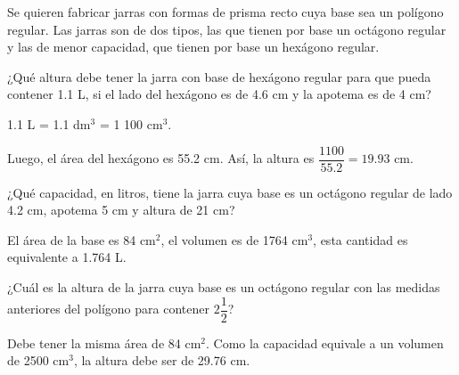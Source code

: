 Se quieren fabricar jarras con formas de prisma recto cuya base sea un
polígono regular. Las jarras son de dos tipos, las que tienen por base un
octágono regular y las de menor capacidad, que tienen por base un
hexágono regular.

\begin{parts}
    ¿Qué altura debe tener la jarra con base de hexágono regular para que pueda
    contener 1.1 L, si el lado del hexágono es de 4.6 cm y la apotema es de 4 cm?

    \begin{solutionbox}{2.2cm}
        1.1 L = 1.1 dm$^3$ = 1 100 cm$^3$.

        Luego, el área del hexágono es 55.2 cm.
        Así, la altura es $\dfrac{1100}{55.2} = 19.93$ cm.
    \end{solutionbox}

    ¿Qué capacidad, en litros, tiene la jarra cuya base es un octágono regular de lado 4.2 cm, apotema 5 cm y altura de 21 cm?

    \begin{solutionbox}{1.2cm}
        El área de la base es 84 cm$^2$, el volumen es de 1764 cm$^3$, esta cantidad es
        equivalente a 1.764 L.
    \end{solutionbox}

    ¿Cuál es la altura de la jarra cuya base es un octágono regular con las medidas
    anteriores del polígono para contener $2\dfrac{1}{2}$?

    \begin{solutionbox}{1.7cm}
        Debe tener la misma área de 84 cm$^2$. Como la capacidad equivale a un
        volumen de 2500 cm$^3$, la altura debe ser de 29.76 cm.
    \end{solutionbox}
\end{parts}
